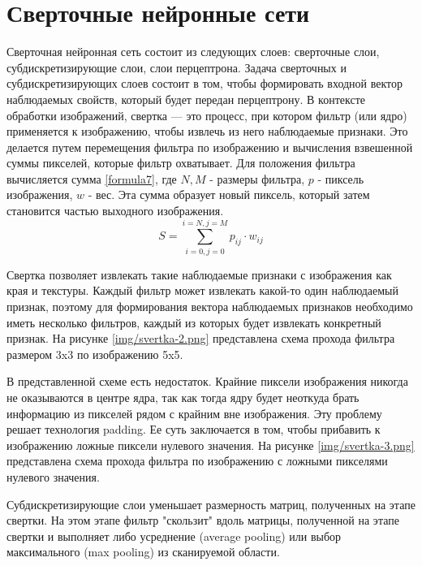 \chapter{Сверточные нейронные сети}
Сверточная нейронная сеть состоит из следующих слоев: сверточные слои, субдискретизирующие слои, слои перцептрона. Задача сверточных и субдискретизирующих слоев состоит в том, чтобы формировать входной вектор наблюдаемых свойств, который будет передан перцептрону. В контексте обработки изображений, свертка — это процесс, при котором фильтр (или ядро) применяется к изображению, чтобы извлечь из него наблюдаемые признаки. Это делается путем перемещения фильтра по изображению и вычисления взвешенной суммы пикселей, которые фильтр охватывает. Для положения фильтра вычисляется сумма \ref{formula7}, где $N, M$ - размеры фильтра, $p$ - пиксель изображения, $w$ - вес. Эта сумма образует новый пиксель, который затем становится частью выходного изображения. 
\begin{equation}
S = \sum_{i=0, j=0}^{i=N, j=M}p_{ij} \cdot w_{ij}
\label{formula7}
\end{equation}

Свертка позволяет извлекать такие наблюдаемые признаки с изображения как края и текстуры. Каждый фильтр может извлекать какой-то один наблюдаемый признак, поэтому для формирования вектора наблюдаемых признаков необходимо иметь несколько фильтров, каждый из которых будет извлекать конкретный признак. На рисунке \ref{img/svertka-2.png} представлена схема прохода фильтра размером 3x3 по изображению 5x5.


В представленной схеме есть недостаток. Крайние пиксели изображения никогда не оказываются в центре ядра, так как тогда ядру будет неоткуда брать информацию из пикселей рядом с крайним вне изображения. Эту проблему решает технология padding. Ее суть заключается в том, чтобы прибавить к изображению ложные пиксели нулевого значения. На рисунке \ref{img/svertka-3.png} представлена схема прохода фильтра по изображению с ложными пикселями нулевого значения.


Субдискретизирующие слои уменьшает размерность матриц, полученных на этапе свертки. На этом этапе фильтр "скользит" вдоль матрицы, полученной на этапе свертки и выполняет либо усреднение (average pooling) или выбор максимального (max pooling) из сканируемой области.

